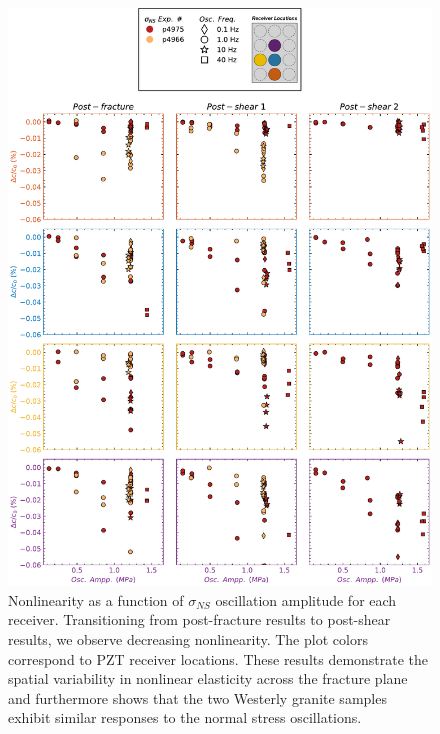 \documentclass[letterpaper,10pt]{article}
\begin{document}
	\begin{figure}[ht]
		\centering
		\includegraphics[width=0.9\columnwidth]{Delc_bypair_all_NS}
		\caption{Nonlinearity as a function of $ \sigma_{NS} $ oscillation amplitude for each receiver. Transitioning from post-fracture results to post-shear results, we observe decreasing nonlinearity. The plot colors correspond to PZT receiver locations. These results demonstrate the spatial variability in nonlinear elasticity across the fracture plane and furthermore shows that the two Westerly granite samples exhibit similar responses to the normal stress oscillations.  }
		\label{fig:delc_plots_ns}
	\end{figure}
	
	\clearpage
	
\end{document}

